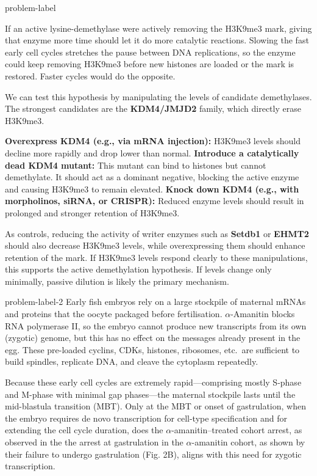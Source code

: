 \begin{multicols}{2}

\begin{problem}{}{problem-label}
    
    If an active lysine-demethylase were actively removing the H3K9me3 mark, giving that enzyme more time should let it do more catalytic reactions. Slowing the fast early cell cycles stretches the pause between DNA replications, so the enzyme could keep removing H3K9me3 before new histones are loaded or the mark is restored. Faster cycles would do the opposite.

    We can test this hypothesis by manipulating the levels of candidate demethylases. The strongest candidates are the \textbf{KDM4/JMJD2} family, which directly erase H3K9me3.
    
    
    \textbf{Overexpress KDM4 (e.g., via mRNA injection):} H3K9me3 levels should decline more rapidly and drop lower than normal.
    \textbf{Introduce a catalytically dead KDM4 mutant:} This mutant can bind to histones but cannot demethylate. It should act as a dominant negative, blocking the active enzyme and causing H3K9me3 to remain elevated.
    \textbf{Knock down KDM4 (e.g., with morpholinos, siRNA, or CRISPR):} Reduced enzyme levels should result in prolonged and stronger retention of H3K9me3.
    
    
    \noindent As controls, reducing the activity of writer enzymes such as \textbf{Setdb1} or \textbf{EHMT2} should also decrease H3K9me3 levels, while overexpressing them should enhance retention of the mark. If H3K9me3 levels respond clearly to these manipulations, this supports the active demethylation hypothesis. If levels change only minimally, passive dilution is likely the primary mechanism.      


\end{problem}


\begin{problem}{}{problem-label-2}
    Early fish embryos rely on a large stockpile of maternal mRNAs and proteins that the oocyte packaged before fertilisation. \(\alpha\)-Amanitin blocks RNA polymerase II, so the embryo cannot produce new transcripts from its own (zygotic) genome, but this has no effect on the messages already present in the egg. These pre-loaded cyclins, CDKs, histones, ribosomes, etc.\ are sufficient to build spindles, replicate DNA, and cleave the cytoplasm repeatedly.

    Because these early cell cycles are extremely rapid—comprising mostly S-phase and M-phase with minimal gap phases—the maternal stockpile lasts until the mid-blastula transition (MBT). Only at the MBT or onset of gastrulation, when the embryo requires de novo transcription for cell-type specification and for extending the cell cycle duration, does the \(\alpha\)-amanitin–treated cohort arrest, as observed in the the arrest at gastrulation in the \(\alpha\)-amanitin cohort, as shown by their failure to undergo gastrulation (Fig. 2B), aligns with this need for zygotic transcription.
    

\end{problem}
\end{multicols}
